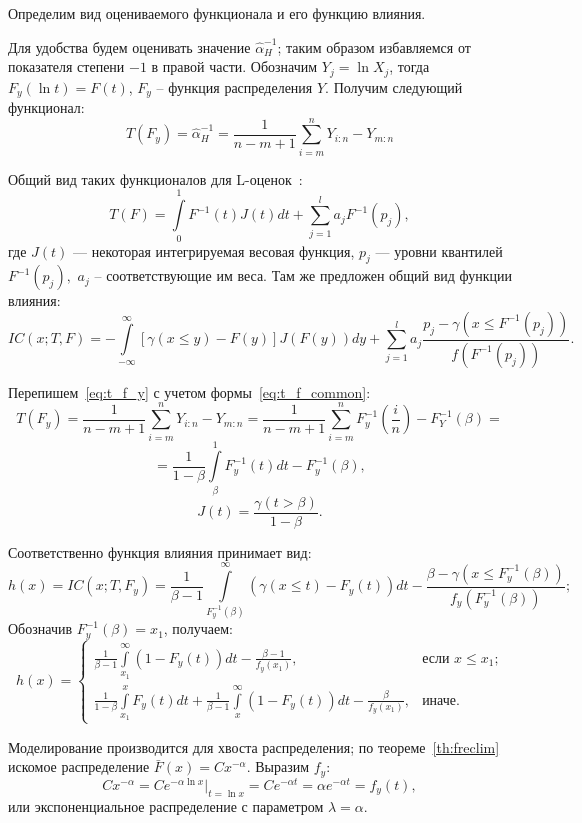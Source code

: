 \documentclass[12pt, specialist, subf, substylefile = spbu.rtx]{disser}
\begin{document}
Определим вид оцениваемого функционала и его функцию влияния.

Для удобства будем оценивать значение $\hat{\alpha}_H^{-1}$; таким образом избавляемся от показателя степени $-1$ в правой части. Обозначим $Y_j=\ln X_j$, тогда $F_y(\ln t)=F(t)$, $F_y$ -- функция распределения $Y$. Получим следующий функционал:
\begin{equation}\label{eq:t_f_y}
T(F_y)=\hat{\alpha}_H^{-1}=\frac{1}{n-m+1} \sum\limits_{i=m}^n Y_{i:n}- Y_{m:n}
\end{equation}

Общий вид таких функционалов для L-оценок~\cite[стр.~263]{Serfling}:
\begin{equation}\label{eq:t_f_common}
T(F)=\int\limits_0^1 F^{-1}(t)J(t)dt + \sum\limits_{j=1}^l a_jF^{-1}(p_j),
\end{equation}
где $J(t)$ --- некоторая интегрируемая весовая функция, $p_j$ --- уровни квантилей $F^{-1}(p_j),$ $a_j$ -- соответствующие им веса. Там же предложен общий вид функции влияния:
$$
IC(x; T, F)=-\int\limits_{-\infty}^\infty [\gamma(x \le y) - F(y)]J(F(y))dy+ \sum\limits_{j=1}^l a_j\frac{p_j-\gamma(x \le F^{-1}(p_j))}{f(F^{-1}(p_j))}.
$$

Перепишем~\eqref{eq:t_f_y} с учетом формы~\eqref{eq:t_f_common}:
$$
T(F_y)=\frac{1}{n-m+1} \sum\limits_{i=m}^n Y_{i:n}-Y_{m:n}=
\frac{1}{n-m+1} \sum\limits_{i=m}^n F_y^{-1}(\frac{i}{n})-F_Y^{-1}(\beta)=
$$
\begin{equation}\label{eq:t_hill_res}
=\frac{1}{1-\beta} \int\limits_\beta^1 F_y^{-1}(t) dt-F_y^{-1}(\beta),
\end{equation}
$$
J(t)=\frac{\gamma(t>\beta)}{1-\beta}.
$$

Соответственно функция влияния принимает вид:
$$
h(x)=IC(x; T, F_y)=\frac{1}{\beta-1}\int\limits_{F_y^{-1}(\beta)}^\infty 
(\gamma(x \le t) - F_y(t))dt- \frac{\beta-\gamma(x \le F_y^{-1}(\beta))}{f_y(F_y^{-1}(\beta))};
$$
Обозначив $F_y^{-1}(\beta)=x_1$, получаем:
\begin{equation}\label{eq:h_cases}
h(x)=
\begin{cases}
\frac{1}{\beta-1}\int\limits_{x_1}^\infty (1-F_y(t))dt-\frac{\beta-1}{f_y(x_1)}, 
	&\text{если $x \le x_1$;} \\
\frac{1}{1-\beta}\int\limits_{x_1}^x F_y(t)dt+\frac{1}{\beta-1}\int\limits_x^\infty(1-F_y(t))dt-\frac{\beta}{f_y(x_1)} , 
	&\text{иначе.}
\end{cases}
\end{equation}

Моделирование производится для хвоста распределения; по теореме~\ref{th:freclim} искомое распределение $\bar{F}(x)=Cx^{-\alpha}$. Выразим $f_y$:
$$
Cx^{-\alpha}=Ce^{-\alpha \ln x}|_{t=\ln x}=
Ce^{-\alpha t}=\alpha e^{-\alpha t}=f_y(t),
$$
или экспоненциальное распределение с параметром $\lambda=\alpha$. 
\end{document}
